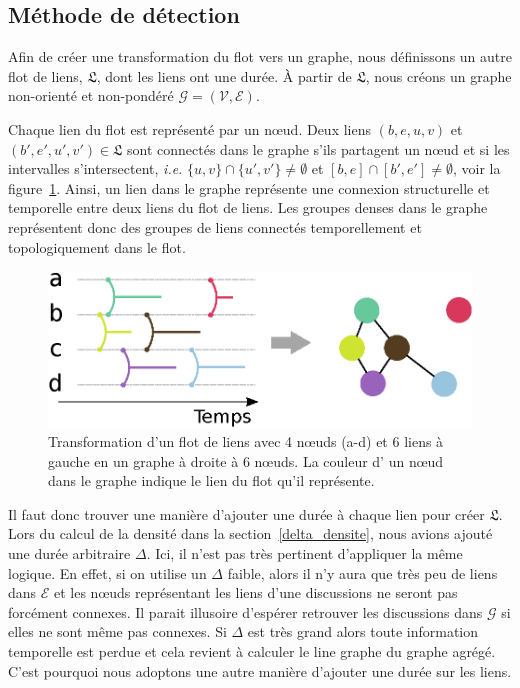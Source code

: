 \subsection{Méthode de détection}
\label{sec:fail_mailing}
Afin de créer une transformation du flot vers un graphe, nous définissons un autre flot de liens, $\mathfrak{L}$, dont les liens ont une durée.
\`A partir de $\mathfrak{L}$, nous créons un graphe non-orienté et non-pondéré $\mathcal{G} = (\mathcal{V},\mathcal{E})$.

Chaque lien du flot est représenté par un n\oe ud.
Deux liens $(b,e,u,v)$ et $(b',e',u',v') \in \mathfrak{L}$ sont connectés dans le graphe s'ils partagent un n\oe ud et si les intervalles s'intersectent, \emph{i.e.} $\{u,v\} \cap \{u',v'\} \neq \emptyset$ et $[b,e]\cap[b',e'] \neq \emptyset$, voir la figure~\ref{fig:Transformation}.
Ainsi, un lien dans le graphe représente une connexion structurelle et temporelle entre deux liens du flot de liens.
Les groupes denses dans le graphe représentent donc des groupes de liens connectés temporellement et topologiquement dans le flot.

\begin{figure}
\centering
\includegraphics[width=0.6\linewidth]{img/mailing/Transformation.eps}
\caption{Transformation d'un flot de liens avec 4 n\oe uds (a-d) et 6 liens à gauche en un graphe à droite à 6 n\oe uds. La couleur d' un n\oe ud dans le graphe indique le lien du flot qu'il représente.}
\label{fig:Transformation}
\end{figure}%

Il faut donc trouver une manière d'ajouter une durée à chaque lien pour créer $\mathfrak{L}$.
Lors du calcul de la densité dans la section~\ref{delta_densite}, nous avions ajouté une durée arbitraire $\Delta$.
Ici, il n'est pas très pertinent d'appliquer la même logique.
En effet, si on utilise un $\Delta$ faible, alors il n'y aura que très peu de liens dans $\mathcal{E}$ et les n\oe uds représentant les liens d'une discussions ne seront pas forcément connexes.
Il parait illusoire d'espérer retrouver les discussions dans $\mathcal{G}$ si elles ne sont même pas connexes.
Si $\Delta$ est très grand alors toute information temporelle est perdue et cela revient à calculer le line graphe du graphe agrégé.
C'est pourquoi nous adoptons une autre manière d'ajouter une durée sur les liens.

